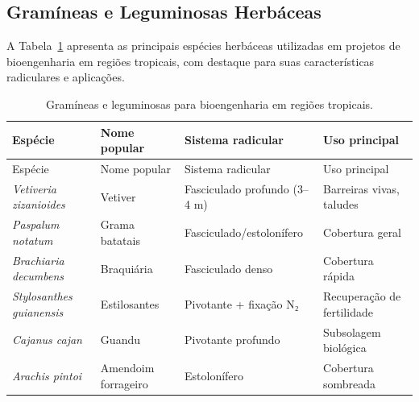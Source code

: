 \documentclass[
  portuguese,
  11pt,
  a4paper,
  open=any]{scrbook}
\begin{document}
\subsection{Gramíneas e Leguminosas
Herbáceas}\label{gramuxedneas-e-leguminosas-herbuxe1ceas}

A Tabela~\ref{tbl-gramineas} apresenta as principais espécies herbáceas
utilizadas em projetos de bioengenharia em regiões tropicais, com
destaque para suas características radiculares e aplicações.

\begin{longtable}[]{@{}
  >{\raggedright\arraybackslash}p{}
  >{\raggedright\arraybackslash}p{}
  >{\raggedright\arraybackslash}p{}
  >{\raggedright\arraybackslash}p{}@{}}
\caption{Gramíneas e leguminosas para bioengenharia em regiões
tropicais.}\label{tbl-gramineas}\tabularnewline
\toprule\noalign{}
\begin{minipage}[b]{\linewidth}\raggedright
Espécie
\end{minipage} & \begin{minipage}[b]{\linewidth}\raggedright
Nome popular
\end{minipage} & \begin{minipage}[b]{\linewidth}\raggedright
Sistema radicular
\end{minipage} & \begin{minipage}[b]{\linewidth}\raggedright
Uso principal
\end{minipage} \\
\midrule\noalign{}
\endfirsthead
\toprule\noalign{}
\begin{minipage}[b]{\linewidth}\raggedright
Espécie
\end{minipage} & \begin{minipage}[b]{\linewidth}\raggedright
Nome popular
\end{minipage} & \begin{minipage}[b]{\linewidth}\raggedright
Sistema radicular
\end{minipage} & \begin{minipage}[b]{\linewidth}\raggedright
Uso principal
\end{minipage} \\
\midrule\noalign{}
\endhead
\bottomrule\noalign{}
\endlastfoot
\emph{Vetiveria zizanioides} & Vetiver & Fasciculado profundo (3--4 m) &
Barreiras vivas, taludes \\
\emph{Paspalum notatum} & Grama batatais & Fasciculado/estolonífero &
Cobertura geral \\
\emph{Brachiaria decumbens} & Braquiária & Fasciculado denso & Cobertura
rápida \\
\emph{Stylosanthes guianensis} & Estilosantes & Pivotante + fixação N₂ &
Recuperação de fertilidade \\
\emph{Cajanus cajan} & Guandu & Pivotante profundo & Subsolagem
biológica \\
\emph{Arachis pintoi} & Amendoim forrageiro & Estolonífero & Cobertura
sombreada \\
\end{longtable}
\end{document}
